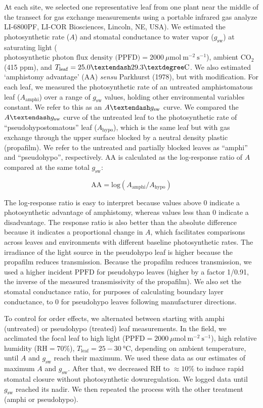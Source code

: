 \documentclass[
  letterpaper,
  DIV=11,
  numbers=noendperiod]{scrartcl}
\begin{document}
At each site, we selected one representative leaf from one plant near
the middle of the transect for gas exchange measurements using a
portable infrared gas analyze LI-6800PF, LI-COR Biosciences, Lincoln,
NE, USA). We estimated the photosynthetic rate (\(A\)) and stomatal
conductance to water vapor (\(g_\text{sw}\)) at saturating light
(\(\text{photosynthetic photon flux density (PPFD)} = 2000~\mu \text{mol}~\text{m}^{-2}~\text{s}^{-1}\)),
ambient CO\(_2\) (415 ppm), and
\(T_\mathrm{leaf} = 25.0 \textendash 29.3° \text{C}\). We also estimated
`amphistomy advantage' (\(\mathrm{AA}\)) \emph{sensu} Parkhurst (1978),
but with modification. For each leaf, we measured the photosynthetic
rate of an untreated amphistomatous leaf (\(A_{\mathrm{amphi}}\)) over a
range of \(g_\text{sw}\) values, holding other environmental variables
constant. We refer to this as an \(A \textendash g_\text{sw}\) curve. We
compared the \(A \textendash g_\text{sw}\) curve of the untreated leaf
to the photosynthetic rate of ``pseudohypostomatous'' leaf
(\(A_\mathrm{hypo}\)), which is the same leaf but with gas exchange
through the upper surface blocked by a neutral density plastic
(propafilm). We refer to the untreated and partially blocked leaves as
``amphi'' and ``pseudohypo'', respectively. \(\mathrm{AA}\) is
calculated as the log-response ratio of \(A\) compared at the same total
\(g_\text{sw}\):

\[\mathrm{AA} = \mathrm{log}(A_{\mathrm{amphi}} / A_{\mathrm{hypo}})\]

The log-response ratio is easy to interpret because values above 0
indicate a photosynthetic advantage of amphistomy, whereas values less
than 0 indicate a disadvantage. The response ratio is also better than
the absolute difference because it indicates a proportional change in
\(A\), which facilitates comparisons across leaves and environments with
different baseline photosynthetic rates. The irradiance of the light
source in the pseudohypo leaf is higher because the propafilm reduces
transmission. Because the propafilm reduces transmission, we used a
higher incident \(\mathrm{PPFD}\) for pseudohypo leaves (higher by a
factor 1/0.91, the inverse of the measured transmissivity of the
propafilm). We also set the stomatal conductance ratio, for purposes of
calculating boundary layer conductance, to 0 for pseudohypo leaves
following manufacturer directions.

To control for order effects, we alternated between starting with amphi
(untreated) or pseudohypo (treated) leaf measurements. In the field, we
acclimated the focal leaf to high light
(\(\mathrm{PPFD} = 2000~\mu \text{mol}~\text{m}^{-2}~\text{s}^{-1}\)),
high relative humidity (\(\mathrm{RH} = 70\%\)),
\(T_\text{leaf} = 25-30~° \text{C}\), depending on ambient temperature,
until \(A\) and \(g_\text{sw}\) reach their maximum. We used these data
as our estimates of maximum \(A\) and \(g_\text{sw}\). After that, we
decreased \(\mathrm{RH}\) to \(\approx 10\%\) to induce rapid stomatal
closure without photosynthetic downregulation. We logged data until
\(g_\text{sw}\) reached its nadir. We then repeated the process with the
other treatment (amphi or pseudohypo).
\end{document}

